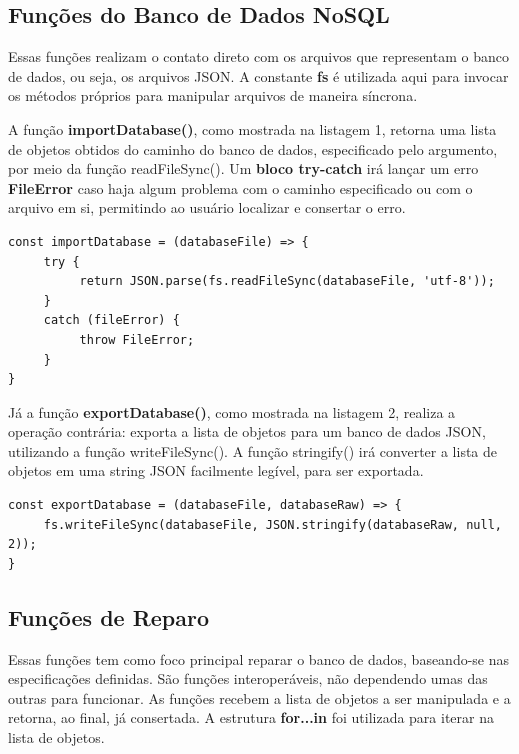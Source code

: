\documentclass[12pt]{article}
\begin{document}
\subsection{Funções do Banco de Dados NoSQL}

Essas funções realizam o contato direto com os arquivos que representam o banco de dados, ou seja, os arquivos JSON. A constante \textbf{fs} é utilizada aqui para invocar os métodos próprios para manipular arquivos de maneira síncrona.

A função \textbf{importDatabase()}, como mostrada na listagem 1, retorna uma lista de objetos obtidos do caminho do banco de dados, especificado pelo argumento, por meio da função readFileSync(). Um \textbf{bloco try-catch} irá lançar um erro \textbf{FileError} caso haja algum problema com o caminho especificado ou com o arquivo em si, permitindo ao usuário localizar e consertar o erro. 

\begin{lstlisting}[caption=Função importDatabase()]
const importDatabase = (databaseFile) => {
     try {
          return JSON.parse(fs.readFileSync(databaseFile, 'utf-8'));
     }
     catch (fileError) {
          throw FileError;
     }
}
\end{lstlisting}

Já a função \textbf{exportDatabase()}, como mostrada na listagem 2, realiza a operação contrária: exporta a lista de objetos para um banco de dados JSON, utilizando a função writeFileSync(). A função stringify() irá converter a lista de objetos em uma string JSON facilmente legível, para ser exportada.

\begin{lstlisting}[caption=Função exportDatabase()]
const exportDatabase = (databaseFile, databaseRaw) => {
     fs.writeFileSync(databaseFile, JSON.stringify(databaseRaw, null, 2));
}
\end{lstlisting}

\subsection{Funções de Reparo}

Essas funções tem como foco principal reparar o banco de dados, baseando-se nas especificações definidas. São funções interoperáveis, não dependendo umas das outras para funcionar. As funções recebem a lista de objetos a ser manipulada e a retorna, ao final, já consertada. A estrutura \textbf{for...in} foi utilizada para iterar na lista de objetos.
\end{document}
